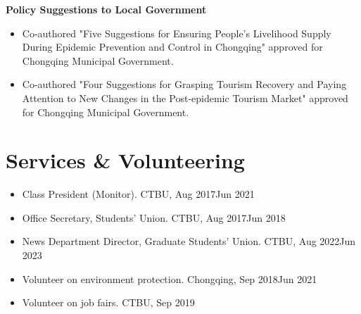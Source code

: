 \documentclass[a4paper,20pt]{article}
\begin{document}
    \textbf{Policy Suggestions to Local Government}

    \begin{itemize}
        \item Co-authored "Five Suggestions for Ensuring People's Livelihood Supply During Epidemic Prevention and Control in Chongqing" approved for Chongqing Municipal Government.  \vspace{-5pt}
        \item Co-authored "Four Suggestions for Grasping Tourism Recovery and Paying Attention to New Changes in the Post-epidemic Tourism Market" approved for Chongqing Municipal Government.
    \end{itemize}



% 	



\section{Services \& Volunteering}
    \begin{itemize}
    \centering
    \justifying
\item{Class President (Monitor). CTBU, Aug 2017\textemdash Jun 2021}
    \vspace{-5pt}
\item{Office Secretary, Students' Union. CTBU, Aug 2017\textemdash Jun 2018}
        \vspace{-5pt}
\item{News Department Director, Graduate Students' Union. CTBU, Aug 2022\textemdash Jun 2023}
        \vspace{-5pt}
\item{Volunteer on environment protection. Chongqing, Sep 2018\textemdash Jun 2021}
        \vspace{-5pt}
\item{Volunteer on job fairs. CTBU, Sep 2019}
    \end{itemize}
\end{document}
